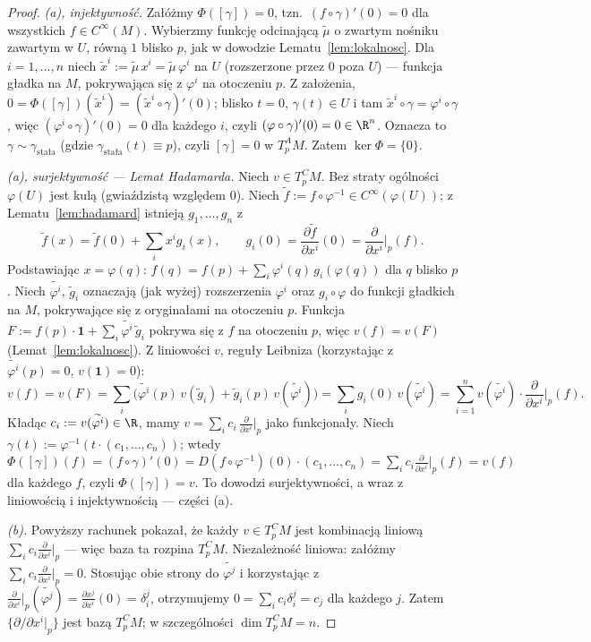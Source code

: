 \begin{proof}
\emph{(a), injektywność.} Załóżmy $\Phi([\gamma])=0$, tzn.\ $(f\circ\gamma)'(0)=0$ dla
wszystkich $f\in C^\infty(M)$. Wybierzmy funkcję odcinającą
$\tilde\mu$ o zwartym nośniku zawartym w $U$, równą $1$ blisko $p$,
jak w dowodzie Lematu~\ref{lem:lokalnosc}.
Dla $i=1,\dots,n$ niech $\tilde x^i:=\tilde\mu\,x^i
=\tilde\mu\,\varphi^i$ na $U$ (rozszerzone przez $0$ poza $U$) —
funkcja gładka na $M$, pokrywająca się z $\varphi^i$ na otoczeniu $p$. Z założenia,
$0=\Phi([\gamma])(\tilde x^i)=(\tilde x^i\circ\gamma)'(0)$; blisko $t=0$, $\gamma(t)\in U$
i tam $\tilde x^i\circ\gamma=\varphi^i\circ\gamma$, więc $(\varphi^i\circ\gamma)'(0)=0$ dla
każdego $i$, czyli $(\varphi\circ\gamma)'(0)=0\in\R^n$. Oznacza to $\gamma\sim
\gamma_{\text{stała}}$ (gdzie $\gamma_{\text{stała}}(t)\equiv p$), czyli $[\gamma]=0$ w
$T_p^AM$. Zatem $\ker\Phi=\{0\}$.

\emph{(a), surjektywność — Lemat Hadamarda.} Niech $v\in T_p^CM$. Bez straty ogólności
$\varphi(U)$ jest kulą (gwiaździstą względem $0$). Niech $\tilde f:=f\circ\varphi^{-1}\in
C^\infty(\varphi(U))$; z Lematu~\ref{lem:hadamard} istnieją $g_1,\dots,g_n$ z
\[
\tilde f(x)=\tilde f(0)+\sum_ix^ig_i(x), \qquad g_i(0)=\frac{\partial\tilde f}{\partial x^i}
(0)=\frac{\partial}{\partial x^i}\Big|_p(f).
\]
Podstawiając $x=\varphi(q)$: $f(q)=f(p)+\sum_i\varphi^i(q)\,g_i(\varphi(q))$ dla $q$
blisko $p$. Niech $\widetilde{\varphi^i}$, $\tilde g_i$ oznaczają (jak wyżej) rozszerzenia
$\varphi^i$ oraz $g_i\circ\varphi$ do funkcji gładkich na $M$, pokrywające się z
oryginałami na otoczeniu $p$. Funkcja $F:=f(p)\cdot\mathbf1+\sum_i\widetilde{\varphi^i}\,
\tilde g_i$ pokrywa się z $f$ na otoczeniu $p$, więc $v(f)=v(F)$ (Lemat~\ref{lem:lokalnosc}).
Z liniowości $v$, reguły Leibniza (korzystając z $\widetilde{\varphi^i}(p)=0$,
$v(\mathbf1)=0$):
\[
v(f)=v(F)=\sum_i\Big(\widetilde{\varphi^i}(p)\,v(\tilde g_i)+\tilde g_i(p)\,v
(\widetilde{\varphi^i})\Big)=\sum_ig_i(0)\,v(\widetilde{\varphi^i})=\sum_{i=1}^n
v(\widetilde{\varphi^i})\cdot\frac{\partial}{\partial x^i}\Big|_p(f).
\]
Kładąc $c_i:=v(\widetilde{\varphi^i})\in\R$, mamy $v=\sum_ic_i\,\frac{\partial}{\partial
x^i}\big|_p$ jako funkcjonały. Niech $\gamma(t):=\varphi^{-1}(t\cdot(c_1,\dots,c_n))$; wtedy
$\Phi([\gamma])(f)=(f\circ\gamma)'(0)=D(f\circ\varphi^{-1})(0)\cdot(c_1,\dots,c_n)=
\sum_ic_i\frac{\partial}{\partial x^i}\big|_p(f)=v(f)$ dla każdego $f$, czyli
$\Phi([\gamma])=v$. To dowodzi surjektywności, a wraz z liniowością i injektywnością —
części (a).

\emph{(b).} Powyższy rachunek pokazał, że każdy $v\in T_p^CM$ jest kombinacją liniową
$\sum_ic_i\frac{\partial}{\partial x^i}\big|_p$ — więc baza ta rozpina $T_p^CM$. Niezależność
liniowa: załóżmy $\sum_ic_i\frac{\partial}{\partial x^i}\big|_p=0$. Stosując obie strony
do $\widetilde{\varphi^j}$ i korzystając z $\frac{\partial}{\partial x^i}\big|_p
(\widetilde{\varphi^j})=\frac{\partial x^j}{\partial x^i}(0)=\delta_i^j$, otrzymujemy
$0=\sum_ic_i\delta_i^j=c_j$ dla każdego $j$. Zatem $\{\partial/\partial x^i|_p\}$ jest
bazą $T_p^CM$; w szczególności $\dim T_p^CM=n$.
\end{proof}

